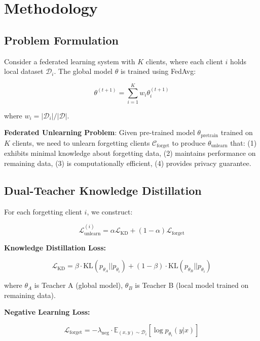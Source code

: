 \documentclass[10pt,twocolumn]{article}
\begin{document}
\section{Methodology}

\subsection{Problem Formulation}

Consider a federated learning system with $K$ clients, where each client $i$ holds local dataset $\mathcal{D}_i$. The global model $\theta$ is trained using FedAvg:

\begin{equation}
\theta^{(t+1)} = \sum_{i=1}^{K} w_i \theta_i^{(t+1)}
\end{equation}

where $w_i = |\mathcal{D}_i|/|\mathcal{D}|$.

\textbf{Federated Unlearning Problem}: Given pre-trained model $\theta_{\text{pretrain}}$ trained on $K$ clients, we need to unlearn forgetting clients $\mathcal{C}_{\text{forget}}$ to produce $\theta_{\text{unlearn}}$ that: (1) exhibits minimal knowledge about forgetting data, (2) maintains performance on remaining data, (3) is computationally efficient, (4) provides privacy guarantee.

\subsection{Dual-Teacher Knowledge Distillation}

For each forgetting client $i$, we construct:

\begin{equation}
\mathcal{L}_{\text{unlearn}}^{(i)} = \alpha \mathcal{L}_{\text{KD}} + (1 - \alpha) \mathcal{L}_{\text{forget}}
\end{equation}

\textbf{Knowledge Distillation Loss:}

\begin{equation}
\mathcal{L}_{\text{KD}} = \beta \cdot \text{KL}(p_{\theta_A} || p_{\theta_i}) + (1 - \beta) \cdot \text{KL}(p_{\theta_B} || p_{\theta_i})
\end{equation}

where $\theta_A$ is Teacher A (global model), $\theta_B$ is Teacher B (local model trained on remaining data).

\textbf{Negative Learning Loss:}

\begin{equation}
\mathcal{L}_{\text{forget}} = -\lambda_{\text{neg}} \cdot \mathbb{E}_{(x, y) \sim \mathcal{D}_i} [\log p_{\theta_i}(y | x)]
\end{equation}
\end{document}
